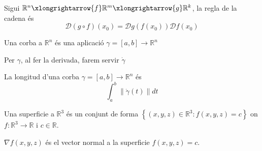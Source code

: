 \documentclass[../main.tex]{subfiles}
\begin{document}
    \begin{definicio}
        Sigui $\mathbb{R}^n \xlongrightarrow{f} \mathbb{R}^m \xlongrightarrow{g} \mathbb{R}^k$, la
        regla de la cadena és
        \begin{displaymath}
            \mathcal{D}\left(g \circ f\right)(x_0) = \mathcal{D}g\left(f\left(x_0\right) \right) \mathcal{D}f\left(x_0\right)
        \end{displaymath}
    \end{definicio}
    \begin{definicio}
        Una corba a $\mathbb{R}^n$ és una aplicació $\gamma = [a,b] \to \mathbb{R}^n$ 
    \end{definicio}
    \begin{notacio}
        Per $\gamma$, al fer la derivada, farem servir $\dot{\gamma}$
    \end{notacio}
    \begin{definicio}
        La longitud d'una corba $\gamma = [a,b] \to \mathbb{R}^n$ és
        \begin{displaymath}
            \int_a^b \left\lVert \dot{\gamma}\left(t\right)\right\rVert  dt
        \end{displaymath}
    \end{definicio}
    \begin{definicio}
        Una superficie a $\mathbb{R}^3$ és un conjunt de forma $\left\{\left(x,y,z\right) \in \mathbb{R}^3 : f\left(x,y,z\right) = c\right\}$
        on $f: \mathbb{R}^3 \to \mathbb{R}$ i $c \in \mathbb{R}$.
    \end{definicio}
    \begin{obs}
        $\nabla f\left(x,y,z\right)$ és el vector normal a la superficie $f\left(x,y,z\right) = c$. 
    \end{obs}
\end{document}
